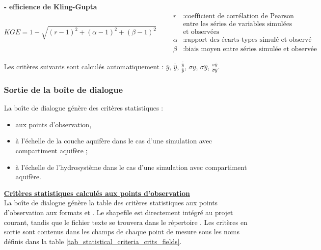 \textbf{ - efficience de Kling-Gupta} \citep{gupta2012}
\begin{equation}
    KGE = 1 - \sqrt{(r - 1)^2 + (\alpha - 1)^2 + (\beta - 1)^2}
    \quad \quad
    \begin{array}{ll}
         r & : \text{coefficient de corrélation de Pearson} \\
         & \text{entre les séries de variables simulées} \\
         & \text{et observées} \\
        \alpha & : \text{rapport des écarts-types simulé et observé} \\
        \beta  & : \text{biais moyen entre séries simulée et observée}
    \end{array}
\end{equation}




Les critères suivants sont calculés automatiquement : $\overline{y}$, $\overline{\hat{y}}$, $\frac{\overline{\hat{y}}}{\overline{y}}$, $\sigma y$,  $\sigma \hat{y}$, $\frac{\sigma \hat{y}}{\sigma y}$.

\subsubsection*{Sortie de la boîte de dialogue }
\label{sec_stats_crits}

La boîte de dialogue génère des critères statistiques :
\begin{itemize}
    \item aux points d'observation,
    \item à l'échelle de la couche aquifère dans le cas d'une simulation avec compartiment aquifère ;
    \item à l'échelle de l'hydrosystème dans le cas d'une simulation avec compartiment aquifère.
\end{itemize}
\vspace{0.3cm}

\underline{\textbf{Critères statistiques calculés aux points d'observation}}\\
La boîte de dialogue génère la table des critères statistiques aux points d'observation aux formats  et . Le shapefile est directement intégré au projet  courant, tandis que le fichier texte se trouvera dans le répertoire . Les critères en sortie sont contenus dans les champs de chaque point de mesure sous les noms définis dans la table \ref{tab_statistical_criteria_crits_fields}.

